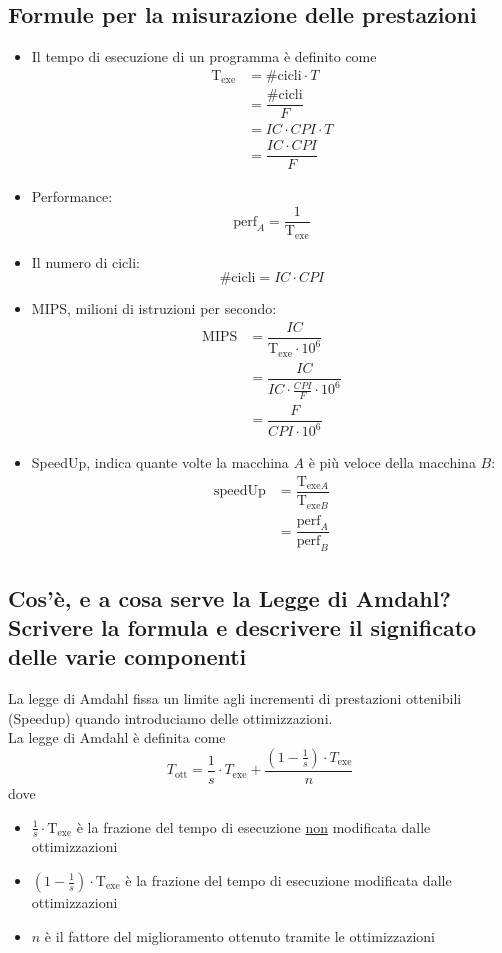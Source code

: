 \documentclass[italian]{article}
\begin{document}
	\subsection{Formule per la misurazione delle prestazioni}
	\begin{itemize}
		\item Il tempo di esecuzione di un programma è definito come
			\[
				\begin{split}
					\text{T}_{\text{exe}} &= \text{\# cicli} \cdot T \\[2mm] &= \dfrac{\text{\# cicli} }{F}  \\[2mm] &= IC \cdot CPI \cdot T \\[2mm] &= \dfrac{IC \cdot CPI}{F}
				\end{split}
			\]		
		\item Performance:
			\[
				\text{perf}_A = \dfrac{1}{\text{T}_{\text{exe}}}
			\]
		\item Il numero di cicli:
			\[
				\text{\# cicli} = IC \cdot CPI
			\]
		\item MIPS, milioni di istruzioni per secondo:
			\[
				\begin{split}
					\text{MIPS} &= \dfrac{IC}{\text{T}_{\text{exe}} \cdot 10^6} \\[2mm] &= \dfrac{IC}{IC \cdot \frac{CPI}{F} \cdot 10^6} \\[2mm] &= \dfrac{F}{CPI \cdot 10^6}
				\end{split}
			\]
		\item SpeedUp, indica quante volte la macchina $A$ è più veloce della macchina $B$:
		\[
			\begin{split}
				\text{speedUp} &= \dfrac{\text{T}_{\text{exe}A}}{\text{T}_{\text{exe}B}} \\[2mm]
				&= \dfrac{\text{perf}_A}{\text{perf}_B}
			\end{split}
		\] 
	\end{itemize}
	\subsection{Cos'è, e a cosa serve la Legge di Amdahl? Scrivere la formula e descrivere il significato delle varie componenti}
	
	
	La legge di Amdahl fissa un limite agli incrementi di prestazioni ottenibili (Speedup) quando introduciamo delle ottimizzazioni.\\[2mm]
	La legge di Amdahl è definita come
		\[
			T_{\text{ott}} = \dfrac{1}{s}\cdot T_{\text{exe}} + \dfrac{\left(1 - \frac{1}{s} \right) \cdot 	T_{\text{exe}}}{n}
		\]
	dove 
	\begin{itemize}
		\item $\frac{1}{s} \cdot \text{T}_{\text{exe}}$ è la frazione del tempo di esecuzione \underline{non} modificata dalle ottimizzazioni
		\item $\left( 1 - \frac{1}{s} \right) \cdot \text{T}_{\text{exe}}$ è la frazione del tempo di esecuzione modificata dalle ottimizzazioni
		\item $n$ è il fattore del miglioramento ottenuto tramite le ottimizzazioni
	\end{itemize}
\end{document}
